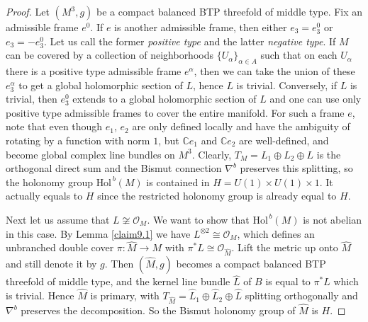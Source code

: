 \documentclass{amsart}
\numberwithin{equation}{section}
\theoremstyle{definition}
\renewcommand{\1}{\mathds{1}}
\renewcommand{\>}{\rightarrow}
\begin{document}
\begin{proof} Let $(M^3,g)$ be a compact balanced BTP threefold of middle type. Fix an admissible frame $e^0$. If $e$ is another admissible frame, then either $e_3=e^0_3$ or $e_3=-e^0_3$. Let us call the former {\em positive type} and the latter {\em negative type}. If $M$ can be covered by a collection of neighborhoods $\{ U_{\alpha} \}_{\alpha \in A}$ such that on each $U_{\alpha}$ there is a positive type admissible frame $e^{\alpha}$, then we can take the union of these $e^{\alpha}_3$ to get a global holomorphic section of $L$, hence $L$ is trivial. Conversely, if $L$ is trivial, then $e^0_3$ extends to a global holomorphic section of $L$ and one can use only positive type admissible frames to cover the entire manifold. For such a frame $e$, note that even though $e_1$, $e_2$ are only defined locally and have the ambiguity of rotating by a function with norm $1$, but ${\mathbb C}e_1$ and ${\mathbb C}e_2$ are well-defined, and become global complex line bundles on $M^3$. Clearly, $T_{\!M}=L_1\oplus L_2\oplus L$ is the orthogonal direct sum and the Bismut connection $\nabla^b$ preserves this splitting, so the holonomy group $\mbox{Hol}^{\,b}(M)$ is contained in $H=U(1)\!\times\!U(1)\!\times\!1$. It actually equals to $H$ since the restricted holonomy group is already equal to $H$.

Next let us assume that $L\not\cong {\mathcal O}_{\!M}$. We want to show that $\mbox{Hol}^{\,b}(M)$ is not abelian in this case.  By  Lemma \ref{claim9.1} we have $L^{\otimes 2}\cong {\mathcal O}_{\!M}$, which defines an unbranched  double cover $\pi : \hat{M} \rightarrow M$ with $\pi^{\ast}L \cong {\mathcal O}_{\!\hat{M}}$. Lift the metric up onto $\hat{M}$ and still denote it by $g$. Then $(\hat{M},g)$ becomes a compact balanced BTP threefold of middle type, and the kernel line bundle $\hat{L}$ of $B$ is equal to $\pi^{\ast}L$ which is trivial. Hence $\hat{M}$ is primary, with $T_{\hat{M}}=\hat{L}_1\oplus \hat{L}_2\oplus \hat{L}$ splitting orthogonally and  $\nabla^b$ preserves the decomposition. So the Bismut holonomy group of $\hat{M}$ is $H$.


\end{proof}
\end{document}
